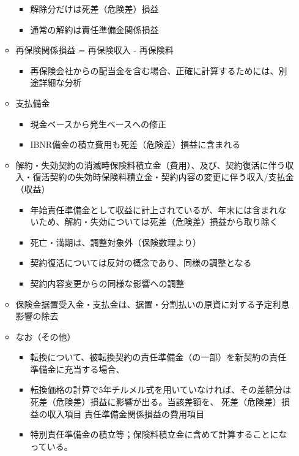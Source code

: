 \documentclass[report,gutter=10mm,fore-edge=10mm,uplatex,dvipdfmx]{jlreq}
\begin{document}
\begin{itemize}
\begin{itemize}
    \begin{itemize}
    \tightlist
    \item
      解除分だけは死差（危険差）損益
    \item
      通常の解約は責任準備金関係損益
    \end{itemize}
  \item
    再保険関係損益 = 再保険収入 - 再保険料

    \begin{itemize}
    \tightlist
    \item
      再保険会社からの配当金を含む場合、正確に計算するためには、別途詳細な分析
    \end{itemize}
  \item
    支払備金

    \begin{itemize}
    \tightlist
    \item
      現金ベースから発生ベースへの修正
    \item
      IBNR備金の積立費用も死差（危険差）損益に含まれる
    \end{itemize}
  \item
    解約・失効契約の消滅時保険料積立金（費用）、及び、契約復活に伴う収入・復活契約の失効時保険料積立金・契約内容の変更に伴う収入/支払金（収益）

    \begin{itemize}
    \tightlist
    \item
      年始責任準備金として収益に計上されているが、年末には含まれないため、解約・失効については死差（危険差）損益から取り除く
    \item
      死亡・満期は、調整対象外（保険数理より）
    \item
      契約復活については反対の概念であり、同様の調整となる
    \item
      契約内容変更からの同様な影響への調整
    \end{itemize}
  \item
    保険金据置受入金・支払金は、据置・分割払いの原資に対する予定利息影響の除去
  \item
    なお（その他）

    \begin{itemize}
    \tightlist
    \item
      転換について、被転換契約の責任準備金（の一部）を新契約の責任準備金に充当する場合、

      \tightlist
      \item
        転換価格の計算で5年チルメル式を用いていなければ、その差額分は死差（危険差）損益に影響が出る。当該差額を、
          死差（危険差）損益の収入項目
          責任準備金関係損益の費用項目
    \item
      特別責任準備金の積立等；保険料積立金に含めて計算することになっている。
    \end{itemize}
  \end{itemize}
\end{itemize}
\end{document}
